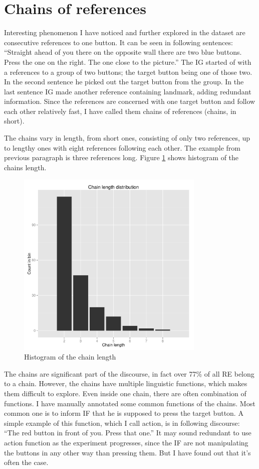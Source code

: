 \section{Chains of references}
\label{sec:dataset-chains}
Interesting phenomenon I have noticed and further explored in the dataset are consecutive references to one button. It can be seen in following sentences: ``Straight ahead of you there on the opposite wall there are two blue buttons. Press the one on the right. The one close to the picture.'' The IG started of with a references to a group of two buttons; the target button being one of those two. In the second sentence he picked out the target button from the group. In the last sentence IG made another reference containing landmark, adding redundant information. Since the references are concerned with one target button and follow each other relatively fast, I have called them chains of references (chains, in short).

The chains vary in length, from short ones, consisting of only two references, up to lengthy ones with eight references following each other. The example from previous paragraph is three references long. Figure \ref{fig:chains_len_histo} shows histogram of the chains length.

\begin{figure}[!htbp]
  \centering
	\includegraphics[width=0.8\textwidth]{Images/chains_len_histo}
	\caption{Histogram of the chain length}
	\label{fig:chains_len_histo}
\end{figure}


The chains are significant part of the discourse, in fact over 77\% of all RE belong to a chain. However, the chains have multiple linguistic functions, which makes them difficult to explore. Even inside one chain, there are often combination of functions. I have manually annotated some common functions of the chains. Most common one is to inform IF that he is supposed to press the target button. A simple example of this function, which I call action, is in following discourse: ``The red button in front of you. Press that one.'' It may sound redundant to use action function as the experiment progresses, since the IF are not manipulating the buttons in any other way than pressing them. But I have found out that it's often the case.

